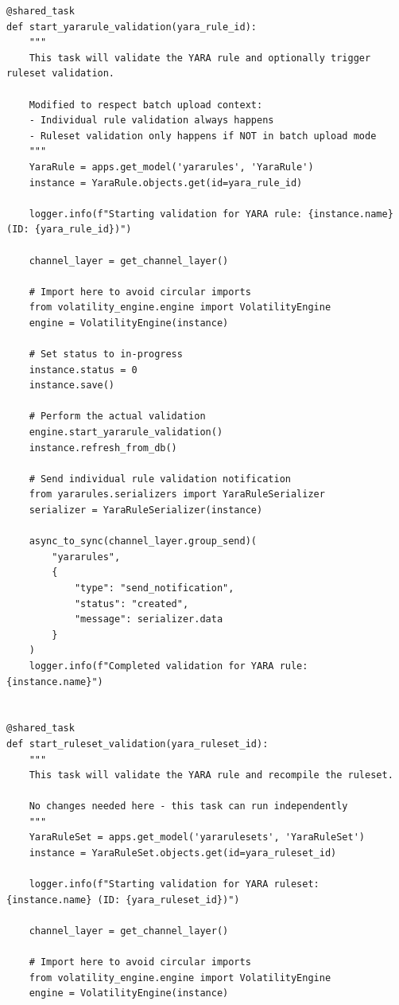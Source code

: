 \begin{verbatim}
@shared_task
def start_yararule_validation(yara_rule_id):
    """
    This task will validate the YARA rule and optionally trigger ruleset validation.
    
    Modified to respect batch upload context:
    - Individual rule validation always happens
    - Ruleset validation only happens if NOT in batch upload mode
    """
    YaraRule = apps.get_model('yararules', 'YaraRule')
    instance = YaraRule.objects.get(id=yara_rule_id)
    
    logger.info(f"Starting validation for YARA rule: {instance.name} (ID: {yara_rule_id})")
    
    channel_layer = get_channel_layer()
    
    # Import here to avoid circular imports
    from volatility_engine.engine import VolatilityEngine
    engine = VolatilityEngine(instance)
    
    # Set status to in-progress
    instance.status = 0
    instance.save()
    
    # Perform the actual validation
    engine.start_yararule_validation()
    instance.refresh_from_db()

    # Send individual rule validation notification
    from yararules.serializers import YaraRuleSerializer
    serializer = YaraRuleSerializer(instance)
    
    async_to_sync(channel_layer.group_send)(
        "yararules",
        {
            "type": "send_notification",
            "status": "created",  
            "message": serializer.data 
        }
    )
    logger.info(f"Completed validation for YARA rule: {instance.name}")


@shared_task
def start_ruleset_validation(yara_ruleset_id):
    """
    This task will validate the YARA rule and recompile the ruleset.
    
    No changes needed here - this task can run independently
    """
    YaraRuleSet = apps.get_model('yararulesets', 'YaraRuleSet')
    instance = YaraRuleSet.objects.get(id=yara_ruleset_id)
    
    logger.info(f"Starting validation for YARA ruleset: {instance.name} (ID: {yara_ruleset_id})")
    
    channel_layer = get_channel_layer()
    
    # Import here to avoid circular imports
    from volatility_engine.engine import VolatilityEngine
    engine = VolatilityEngine(instance)
    

\end{verbatim}
